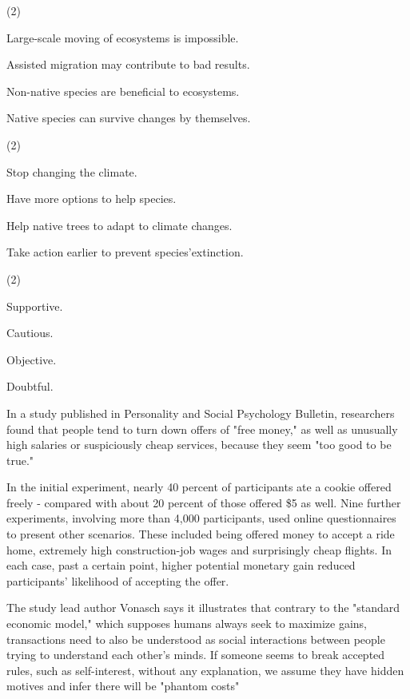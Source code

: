\documentclass{英语试卷}
\begin{document}
\begin{choices}(2)
  \item Large-scale moving of ecosystems is impossible.
  \item Assisted migration may contribute to bad results.
  \item Non-native species are beneficial to ecosystems.
  \item Native species can survive changes by themselves.
\end{choices}
\begin{choices}(2)
  \item Stop changing the climate.
  \item Have more options to help species.
  \item Help native trees to adapt to climate changes.
  \item Take action earlier to prevent species'extinction.
\end{choices}
\begin{choices}(2)
  \item Supportive.
  \item Cautious.
  \item Objective.
  \item Doubtful.
\end{choices}
\par In a study published in Personality and Social Psychology Bulletin, researchers found that people tend to turn down offers of "free money," as well as unusually high salaries or suspiciously cheap services, because they seem "too good to be true."\par
\par In the initial experiment, nearly 40 percent of participants ate a cookie offered freely - compared with about 20 percent of those offered \$5 as well. Nine further experiments, involving more than 4,000 participants, used online questionnaires to present other scenarios. These included being offered money to accept a ride home, extremely high construction-job wages and surprisingly cheap flights. In each case, past a certain point, higher potential monetary gain reduced participants' likelihood of accepting the offer.\par
\par The study lead author Vonasch says it illustrates that contrary to the "standard economic model," which supposes humans always seek to maximize gains, transactions need to also be understood as social interactions between people trying to understand each other's minds. If someone seems to break accepted rules, such as self-interest, without any explanation, we assume they have hidden motives and infer there will be "phantom costs"\par
\end{document}
